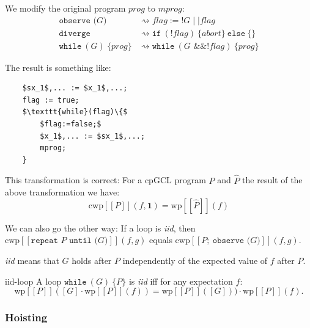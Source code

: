 \documentclass[english]{panikzettel}
\newcommand{\stmtDiverge}{\texttt{diverge}}
\newcommand{\stmtObserve}[1]{\texttt{observe (}#1\texttt{)}}
\newcommand{\stmtSeq}[2]{#1;~ #2}
\newcommand{\stmtIf}[3]{\texttt{if}~(#1)~\{ #2 \}~\texttt{else}~\{ #3 \}}
\newcommand{\stmtWhile}[2]{\texttt{while}~(#1)~\{ #2 \}}
\renewcommand{\wp}{\mathrm{wp}}
\newcommand{\cwp}{\mathrm{cwp}}
\begin{document}
\begin{minipage}[t]{0.55\textwidth}
	We modify the original program $prog$ to $mprog$:
	\begin{align*}
		\stmtObserve{G}     & \rightsquigarrow flag:=!G \mid \mid flag                 \\
		\stmtDiverge        & \rightsquigarrow \stmtIf{!flag}{abort}{}                 \\
		\stmtWhile{G}{prog} & \rightsquigarrow \stmtWhile{G \text{ \&\& } !flag}{prog}
	\end{align*}
\end{minipage}\hfill%
\begin{minipage}[t]{0.4\textwidth}
	\small{}
	The result is something like:
	\begin{lstlisting}
    $sx_1$,... := $x_1$,...;
    flag := true;
    $\texttt{while}(flag)\{$
        $flag:=false;$
        $x_1$,... := $sx_1$,...;
        mprog;
    }
    \end{lstlisting}
\end{minipage}

This transformation is correct: For a cpGCL program $P$ and $\hat{P}$ the result of the above transformation we have:
\[
	\cwp[\![P]\!](f,\mathbf{1})=\wp[\![\hat{P}]\!](f)
\]

\begin{halfboxl}
	We can also go the other way: If a loop is \emph{iid}, then
	$\cwp[\![\texttt{repeat } P \texttt{ until (}G\texttt{)}]\!](f,g)$
	equals
	$\cwp[\![\stmtSeq{P}{\stmtObserve{G}}]\!](f,g)$.

	\emph{iid} means that $G$ holds after $P$ independently of the expected value of $f$ after $P$.
\end{halfboxl}%
\begin{halfboxr}
	\vspace{-\baselineskip}
	\begin{defi}{iid-loop}
		A loop $\stmtWhile{G}{P}$ is \emph{iid} iff for any expectation $f$:
		\footnotesize{}
		\[
			\wp[\![P]\!]([G] {\cdot} \wp[\![P]\!](f)) {=} \wp[\![P]\!]([G])) {\cdot} \wp[\![P]\!](f).
		\]
	\end{defi}
\end{halfboxr}

\vspace{-\baselineskip}

\subsubsection{Hoisting}
\end{document}
